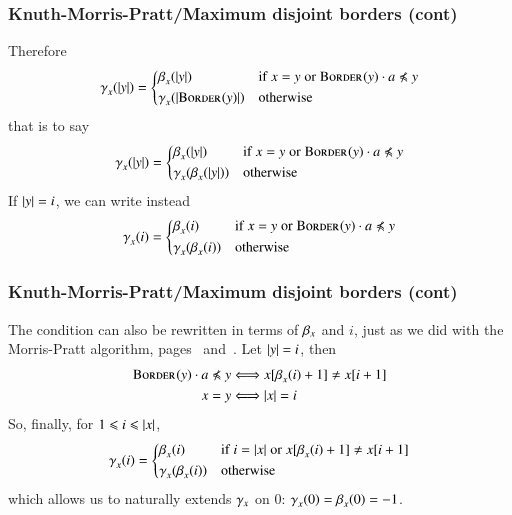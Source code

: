%
\begin{frame}
\frametitle{Knuth-Morris-Pratt/Maximum disjoint borders (cont)}

Therefore
\[
  \KMPsupply{x}{}{\len{y}}
= \left\lbrace
  \begin{aligned}
    &  \MPsupply{x}{}{\len{y}}
    && \text{if} \; x = y \; \text{or}
       \; \Border{}{y} \cdot a \npreccurlyeq y\\
    &  \KMPsupply{x}{}{\len{\Border{}{y}}}
    && \text{otherwise}
  \end{aligned}
  \right.
\]
that is to say
\[
  \KMPsupply{x}{}{\len{y}}
= \left\lbrace
  \begin{aligned}
    &  \MPsupply{x}{}{\len{y}}
    && \text{if} \; x = y \; \text{or}
       \; \Border{}{y} \cdot a \npreccurlyeq y\\
    &  \KMPsupply{x}{}{\MPsupply{x}{}{\len{y}}}
    && \text{otherwise}
  \end{aligned}
  \right.
\]
If \(\lvert{y}\lvert{} = i\), we can write instead
\[
  \KMPsupply{x}{}{i}
= \left\lbrace
  \begin{aligned}
    &  \MPsupply{x}{}{i}
    && \text{if} \; x = y \; \text{or}
       \; \Border{}{y} \cdot a \npreccurlyeq y\\
    &  \KMPsupply{x}{}{\MPsupply{x}{}{i}}
    && \text{otherwise}
  \end{aligned}
  \right.
\]

\end{frame}

%
\begin{frame}
\frametitle{Knuth-Morris-Pratt/Maximum disjoint borders (cont)}

\label{gamma_ref_def}

The condition can also be rewritten in terms of \(\beta_{x}\)
and \(i\), just as we did with the Morris-Pratt algorithm,
pages~\pageref{condition} and~\pageref{morris-pratt-conf}. Let
\(\lvert{y}\lvert{} = i\), then
\begin{align*}
  \Border{}{y} \cdot a \npreccurlyeq y
& \Longleftrightarrow x [\MPsupply{x}{}{i} + 1] \neq x [i + 1]\\
  x = y
& \Longleftrightarrow \len{x} = i
\end{align*}
So, finally, for \(1 \leqslant i \leqslant \lvert{x}\lvert{}\),
\[
  \gamma_{x}^{}(i)
= \left\lbrace
  \begin{aligned}
    &  \beta_{x}^{}(i)
    && \text{if} \; i = \lvert{x}\lvert{} \; \text{or}
       \; x [\beta_{x}^{}(i) + 1] \neq x [i + 1]\\
    &  \gamma_{x}^{}(\beta_{x}^{}(i))
    && \text{otherwise}
  \end{aligned}
  \right.
\]
which allows us to naturally extends \(\gamma_{x}\) on \(0\):
\(\gamma_{x}^{}(0) = \beta_{x}^{}(0) = -1\).

\end{frame}

